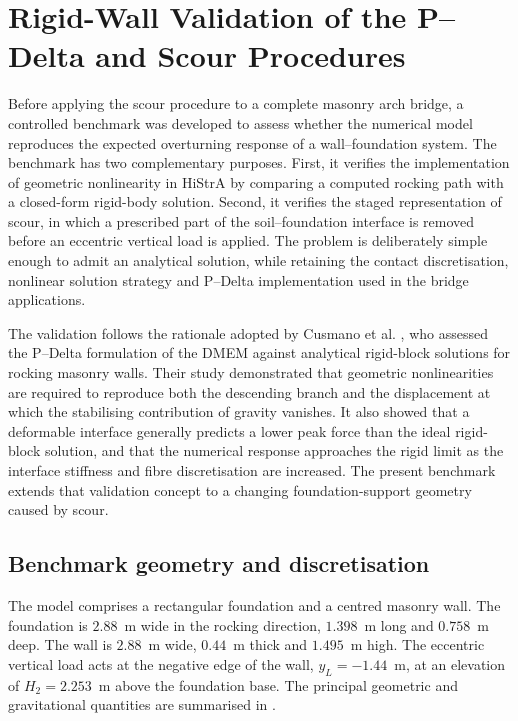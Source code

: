 
\section{Rigid-Wall Validation of the P--Delta and Scour Procedures}
\label{sec:wall-pdelta-scour-validation}

Before applying the scour procedure to a complete masonry arch bridge, a
controlled benchmark was developed to assess whether the numerical model
reproduces the expected overturning response of a wall--foundation system.
The benchmark has two complementary purposes. First, it verifies the
implementation of geometric nonlinearity in HiStrA by comparing a computed
rocking path with a closed-form rigid-body solution. Second, it verifies the
staged representation of scour, in which a prescribed part of the
soil--foundation interface is removed before an eccentric vertical load is
applied. The problem is deliberately simple enough to admit an analytical
solution, while retaining the contact discretisation, nonlinear solution
strategy and P--Delta implementation used in the bridge applications.

The validation follows the rationale adopted by Cusmano et al. \cite{Cusmano2023}, who
assessed the P--Delta formulation of the \gls{DMEM} against analytical
rigid-block solutions for rocking masonry walls. Their study demonstrated
that geometric nonlinearities are required to reproduce both the descending
branch and the displacement at which the stabilising contribution of gravity
vanishes. It also showed that a deformable interface generally predicts a
lower peak force than the ideal rigid-block solution, and that the numerical
response approaches the rigid limit as the interface stiffness and fibre
discretisation are increased. The present benchmark extends that validation
concept to a changing foundation-support geometry caused by scour.

\subsection{Benchmark geometry and discretisation}
\label{sec:wall-validation-geometry}

The model comprises a rectangular foundation and a centred masonry wall. The
foundation is $2.88$~m wide in the rocking direction, $1.398$~m long and
$0.758$~m deep. The wall is $2.88$~m wide, $0.44$~m thick and $1.495$~m high.
The eccentric vertical load acts at the negative edge of the wall,
$y_L=-1.44$~m, at an elevation of $H_2=2.253$~m above the foundation base.
The principal geometric and gravitational quantities are summarised in
.


